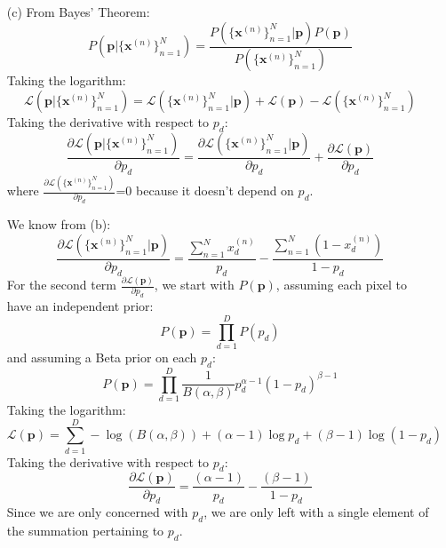 \documentclass[12pt]{article}
\begin{document}
\begin{enumerate}
%
%

\item[(c)] From Bayes' Theorem:
$$P(\textbf{p}|\{\textbf{x}^{(n)}\}_{n=1}^N) = \frac{ P(\{\textbf{x}^{(n)}\}_{n=1}^N|\textbf{p})P(\textbf{p})}{P(\{\textbf{x}^{(n)}\}_{n=1}^N)}$$
Taking the logarithm:
$$\mathcal{L}(\textbf{p}|\{\textbf{x}^{(n)}\}_{n=1}^N) = \mathcal{L}(\{\textbf{x}^{(n)}\}_{n=1}^N|\textbf{p})+ \mathcal{L}(\textbf{p}) - \mathcal{L}(\{\textbf{x}^{(n)}\}_{n=1}^N)$$
Taking the derivative with respect to $p_d$:
$$\frac{\partial\mathcal{L}(\textbf{p}|\{\textbf{x}^{(n)}\}_{n=1}^N)}{\partial p_d} = \frac{\partial\mathcal{L}(\{\textbf{x}^{(n)}\}_{n=1}^N|\textbf{p})}{\partial p_d} + \frac{\partial\mathcal{L}(\textbf{p})}{\partial p_d}$$
where $\frac{\partial\mathcal{L}(\{\textbf{x}^{(n)}\}_{n=1}^N)}{\partial p_d}$=0 because it doesn't depend on $p_d$.

We know from (b):
$$\frac{\partial\mathcal{L}(\{\textbf{x}^{(n)}\}_{n=1}^N|\textbf{p})}{\partial p_d} = \frac{\sum_{n=1}^{N} x_d^{(n)}}{p_d} -  \frac{\sum_{n=1}^{N} (1-x_d^{(n)})}{1-p_d}$$
For the second term $\frac{\partial\mathcal{L}(\textbf{p})}{\partial p_d}$, we start with $P(\textbf{p})$, assuming each pixel to have an independent prior:
$$P(\textbf{p}) = \prod_{d=1}^D P(p_d)$$
and assuming a Beta prior on each $p_d$:
$$P(\textbf{p}) = \prod_{d=1}^D \frac{1}{B(\alpha, \beta)} p^{\alpha-1}_d (1-p_d)^{\beta-1}$$
Taking the logarithm:
$$\mathcal{L}(\textbf{p}) = \sum_{d=1}^{D} -\log (B(\alpha, \beta)) + (\alpha-1)\log p_d + (\beta-1)\log(1-p_d)$$
Taking the derivative with respect to $p_d$:
$$\frac{\partial\mathcal{L}(\textbf{p})}{\partial p_d} = \frac{(\alpha-1)}{p_d} -  \frac{(\beta-1)}{1-p_d}$$
Since we are only concerned with $p_d$, we are only left with a single element of the summation pertaining to $p_d$.



\end{enumerate}
\end{document}

